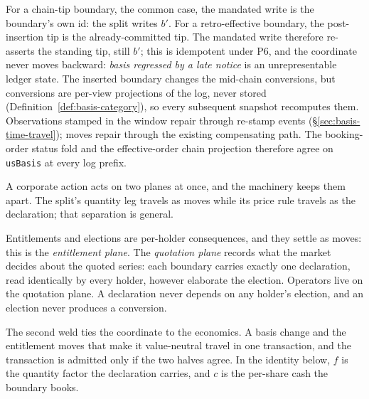 For a chain-tip boundary, the common case, the mandated write is the boundary's
own id: the split writes $b'$. For a retro-effective boundary, the
post-insertion tip is the already-committed tip. The mandated write therefore
re-asserts the standing tip, still $b'$; this is idempotent under P6, and the
coordinate never moves backward: \emph{basis regressed by a late notice} is an
unrepresentable ledger state. The inserted boundary changes the mid-chain
conversions, but conversions are per-view projections of the log, never stored
(Definition~\ref{def:basis-category}), so every subsequent snapshot recomputes
them. Observations stamped in the window repair through re-stamp events
(\S\ref{sec:basis-time-travel}); moves repair through the existing compensating
path. The booking-order status fold and the effective-order chain projection
therefore agree on \texttt{usBasis} at every log prefix.

A corporate action acts on two planes at once, and the machinery keeps them
apart. The split's quantity leg travels as moves while its price rule travels
as the declaration; that separation is general.

\begin{principle}
\label{prin:two-planes}
Entitlements and elections are per-holder consequences, and they settle as
moves: this is the \emph{entitlement plane}. The \emph{quotation plane}
records what the market decides about the quoted series: each boundary
carries exactly one declaration, read identically by every holder, however
elaborate the election. Operators live on the quotation plane. A declaration
never depends on any holder's election, and an election never produces a
conversion.
\end{principle}

The second weld ties the coordinate to the economics. A basis change and the
entitlement moves that make it value-neutral travel in one transaction, and the
transaction is admitted only if the two halves agree. In the identity below,
$f$ is the quantity factor the declaration carries, and $c$ is the per-share
cash the boundary books.

